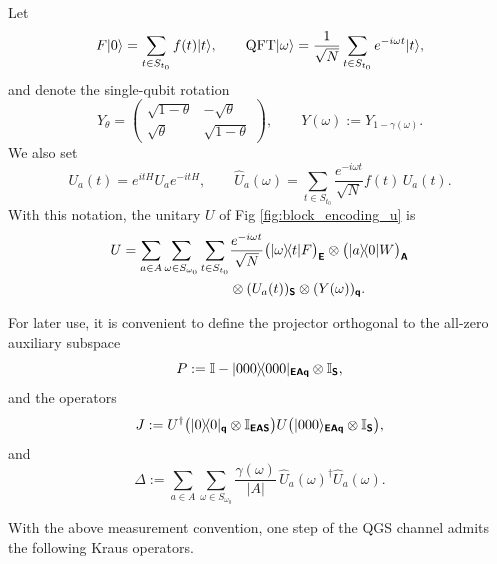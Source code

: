 \documentclass[showpacs,amsmath,amssymb,twocolumn,prx,superscriptaddress,10pt,aps,nofootinbib]{revtex4-2}
\DeclarePairedDelimiter\bra{\langle}{|}
\DeclarePairedDelimiter\ket{|}{\rangle}
\newcommand{\bbI}{\mathbb{I}}
\newcommand{\rS}{\boldsymbol{\mathsf{S}}}
\newcommand{\rE}{\boldsymbol{\mathsf{E}}}
\newcommand{\rA}{\boldsymbol{\mathsf{A}}}
\newcommand{\rqq}{\boldsymbol{\mathsf{q}}}
\newcommand{\qft}{\mathrm{QFT}}
\begin{document}
Let
\begin{equation}
    F\ket{0} = \sum_{t\in S_{t_0}} f(t)\ket{t},
    \qquad
    \qft \ket{\omega} = \frac{1}{\sqrt{N}} \sum_{t\in S_{t_0}} e^{-i \omega t} \ket{t},
\end{equation}
and denote the single-qubit rotation
\begin{equation}
    Y_\theta =
    \begin{pmatrix}
        \sqrt{1-\theta} & -\sqrt{\theta} \\
        \sqrt{\theta}   & \sqrt{1-\theta}
    \end{pmatrix},
    \qquad
    Y(\omega) := Y_{1-\gamma(\omega)}.
\end{equation}
We also set
\begin{equation}
    U_a(t) = e^{i t H} U_a e^{-i t H},
    \qquad
    \hat{U}_a(\omega) = \sum_{t\in S_{t_0}} \frac{e^{-i \omega t}}{\sqrt{N}} f(t)\, U_a(t).
\end{equation}
With this notation, the unitary $U$ of Fig \ref{fig:block_encoding_u} is
\begin{equation}
\begin{split}
    U = \sum_{a\in A} \sum_{\omega \in S_{\omega_0}} \sum_{t\in S_{t_0}}
    &\frac{e^{-i \omega t}}{\sqrt{N}}
    \bigl(\ket{\omega}\!\bra{t} F\bigr)_{\rE}
    \otimes \bigl(\ket{a}\!\bra{0} W\bigr)_{\rA}\\
    &\otimes (U_a(t))_{\rS}
    \otimes (Y(\omega))_{\rqq}.
\end{split}
\end{equation}

For later use, it is convenient to define the projector orthogonal to the all-zero auxiliary subspace
\begin{equation}
    P := \bbI - \ket{000}\!\bra{000}_{\rE\rA\rqq} \otimes \bbI_{\rS},
\end{equation}
and the operators
\begin{equation}
    J := U^{\dagger}
    \bigl(\ket{0}\!\bra{0}_{\rqq} \otimes \bbI_{\rE\rA\rS}\bigr)
    U
    \bigl(\ket{000}_{\rE\rA\rqq} \otimes \bbI_{\rS}\bigr),
\end{equation}
and
\begin{equation}
    \Delta := \sum_{a\in A} \sum_{\omega \in S_{\omega_0}}
    \frac{\gamma(\omega)}{|A|} \, \hat{U}_a(\omega)^{\dagger} \hat{U}_a(\omega).
\end{equation}

With the above measurement convention, one step of the QGS channel admits the following Kraus operators.
\end{document}
